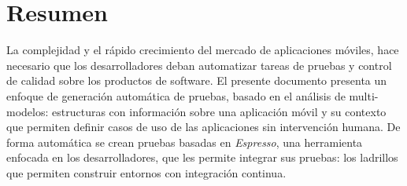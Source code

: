 %
\chapter*{Resumen}
\label{sec:abstract}
\vspace*{-10mm}
La complejidad y el rápido crecimiento del mercado de aplicaciones móviles, hace necesario que los desarrolladores deban automatizar tareas de pruebas y control de calidad sobre los productos de software. El presente documento presenta un enfoque de generación automática de pruebas, basado en el análisis de multi-modelos: estructuras con información sobre una aplicación móvil y su contexto que permiten definir casos de uso de las aplicaciones sin intervención humana. De forma automática se crean pruebas basadas en \textit{Espresso}, una herramienta enfocada en los desarrolladores, que les permite integrar sus pruebas: los ladrillos que permiten construir entornos con integración continua.

\vspace*{20mm}
